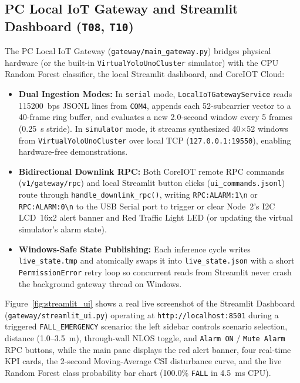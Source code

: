 \documentclass{hcmut-report}
\begin{document}
\subsection[PC Local IoT Gateway and Dashboard (\texttt{T08}, \texttt{T10})]{PC Local IoT Gateway and Streamlit Dashboard (\texttt{T08}, \texttt{T10})}
The PC Local IoT Gateway (\texttt{gateway/main\_gateway.py}) bridges physical hardware (or the built-in \texttt{VirtualYoloUnoCluster} simulator) with the CPU Random Forest classifier, the local Streamlit dashboard, and CoreIOT Cloud:
\begin{itemize}
  \item \textbf{Dual Ingestion Modes:} In \texttt{serial} mode, \texttt{LocalIoTGatewayService} reads 115200~bps JSONL lines from \texttt{COM4}, appends each 52-subcarrier vector to a 40-frame ring buffer, and evaluates a new 2.0-second window every 5 frames (0.25~s stride). In \texttt{simulator} mode, it streams synthesized 40$\times$52 windows from \texttt{VirtualYoloUnoCluster} over local TCP (\texttt{127.0.0.1:19550}), enabling hardware-free demonstrations.
  \item \textbf{Bidirectional Downlink RPC:} Both CoreIOT remote RPC commands (\texttt{v1/gateway/rpc}) and local Streamlit button clicks (\texttt{ui\_commands.jsonl}) route through \texttt{handle\_downlink\_rpc()}, writing \texttt{RPC:ALARM:1\textbackslash n} or \texttt{RPC:ALARM:0\textbackslash n} to the USB Serial port to trigger or clear Node~2's I2C LCD~16x2 alert banner and Red Traffic Light LED (or updating the virtual simulator's alarm state).
  \item \textbf{Windows-Safe State Publishing:} Each inference cycle writes \texttt{live\_state.tmp} and atomically swaps it into \texttt{live\_state.json} with a short \texttt{PermissionError} retry loop so concurrent reads from Streamlit never crash the background gateway thread on Windows.
\end{itemize}

Figure~\ref{fig:streamlit_ui} shows a real live screenshot of the Streamlit Dashboard (\texttt{gateway/streamlit\_ui.py}) operating at \texttt{http://localhost:8501} during a triggered \texttt{FALL\_EMERGENCY} scenario: the left sidebar controls scenario selection, distance (1.0--3.5~m), through-wall NLOS toggle, and \texttt{Alarm ON} / \texttt{Mute Alarm} RPC buttons, while the main pane displays the red alert banner, four real-time KPI cards, the 2-second Moving-Average CSI disturbance curve, and the live Random Forest class probability bar chart (100.0\% \texttt{FALL} in 4.5~ms CPU).
\end{document}
